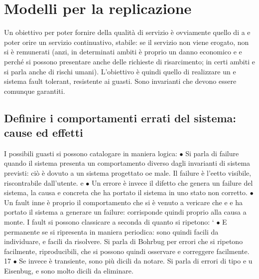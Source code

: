 \documentclass[a4paper,12pt]{article}
\begin{document}
\section{Modelli per la replicazione}
Un obiettivo per poter fornire della qualità di servizio è ovviamente quello di
a
e
poter orire un servizio continuativo, stabile: se il servizio non viene erogato,
non si è remunerati (anzi, in determinati ambiti è proprio un danno economico
e
e
perché si possono presentare anche delle richieste di risarcimento; in certi ambiti
e
si parla anche di rischi umani). L'obiettivo è quindi quello di realizzare un
e
sistema fault tolerant, resistente ai guasti. Sono invarianti che devono essere
comunque garantiti.
\subsection{Definire i comportamenti errati del sistema: cause ed effetti}
I possibili guasti si possono catalogare in maniera logica:
$\bullet$ Si parla di failure quando il sistema presenta un comportamento diverso
dagli invarianti di sistema previsti: ciò è dovuto a un sistema progettato
oe
male. Il failure è l'eetto visibile, riscontrabile dall'utente.
e
$\bullet$ Un errore è invece il difetto che genera un failure del sistema, la causa
e
concreta che ha portato il sistema in uno stato non corretto.
$\bullet$ Un fault inne è proprio il comportamento che si è venuto a vericare che
e
e
ha portato il sistema a generare un failure: corrisponde quindi proprio alla
causa a monte.
I fault si possono classicare a seconda di quanto si ripetono:
`
$\bullet$ E permanente se si ripresenta in maniera periodica: sono quindi facili
da individuare, e facili da risolvere. Si parla di Bohrbug per errori che
si ripetono facilmente, riproducibili, che si possono quindi osservare e
correggere facilmente.
17
$\bullet$ Se invece è transiente, sono più dicili da notare. Si parla di errori di tipo
e
u
Eisenbug, e sono molto dicili da eliminare.
\end{document}
